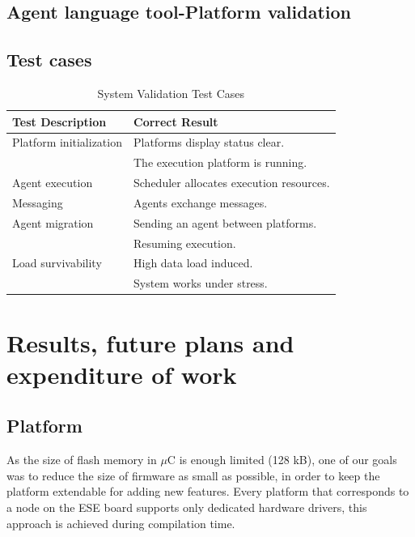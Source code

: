 \documentclass{scrreprt}
\begin{document}
\section{Agent language tool-Platform validation}

\section{Test cases}

\vspace{0.2in}

\begin{table}
\begin{tabular}{|l|l|} \hline
  \textbf{Test Description} & \textbf{Correct Result} \\\hline
  Platform initialization & Platforms display status clear. \\
  & The execution platform is running.\\ \hline
  Agent execution & Scheduler allocates execution resources. \\ \hline
  Messaging & Agents exchange messages.\\ \hline
  Agent migration & Sending an agent between platforms. \\ 
  &  Resuming execution. \\ \hline
  Load survivability  & High data load induced. \\
  & System works under stress. \\ 
  \hline
\end{tabular}
\caption{System Validation Test Cases}
\end{table}

\chapter{Results, future plans and expenditure of work}

\section{Platform}

As the size of flash memory in $\mu$C is enough limited (128 kB),
one of our goals was to reduce the size of firmware as small as possible,
in order to keep the platform extendable for adding new features.
Every platform that corresponds to a node on the ESE board supports only 
dedicated hardware drivers, this approach is achieved during compilation time.
\end{document}
